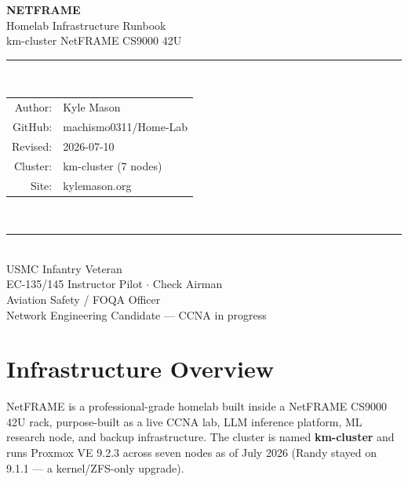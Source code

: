 \documentclass[11pt,letterpaper]{article}
\begin{document}
\begin{titlepage}
\pagecolor{nfdark}
\color{white}
\vspace*{2cm}
\begin{center}
  {\Huge\bfseries\color{nfcyan} NETFRAME}\\[0.3cm]
  {\Large\color{white} Homelab Infrastructure Runbook}\\[0.5cm]
  {\large\color{cmtgray} km-cluster \textbar{} NetFRAME CS9000 42U}\\[2cm]
  \rule{0.8\textwidth}{0.4pt}\\[1cm]
  {\normalsize
    \begin{tabular}{rl}
      \color{nfcyan}Author:    & Kyle Mason \\
      \color{nfcyan}GitHub:    & machismo0311/Home-Lab \\
      \color{nfcyan}Revised:   & 2026-07-10 \\
      \color{nfcyan}Cluster:   & km-cluster (7 nodes) \\
      \color{nfcyan}Site:      & kylemason.org \\
    \end{tabular}
  }\\[2cm]
  \rule{0.8\textwidth}{0.4pt}\\[0.5cm]
  {\small\color{cmtgray}
    USMC Infantry Veteran \\
  EC-135/145 Instructor Pilot $\cdot$ Check Airman \\
    Aviation Safety / FOQA Officer \\
    Network Engineering Candidate --- CCNA in progress
  }
\end{center}
\end{titlepage}
\nopagecolor

\tableofcontents
\newpage

\section{Infrastructure Overview}

NetFRAME is a professional-grade homelab built inside a NetFRAME CS9000 42U rack,
purpose-built as a live CCNA lab, LLM inference platform, ML research node,
and backup infrastructure. The cluster is named \textbf{km-cluster} and runs
Proxmox VE 9.2.3 across seven nodes as of July 2026 (Randy stayed on 9.1.1 —
a kernel/ZFS-only upgrade).
\end{document}

